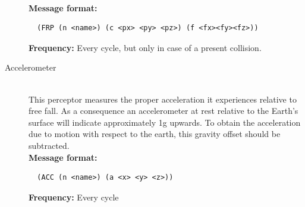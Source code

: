 \begin{description}
  \hfill \\
{ \bf Message format:}
  \begin{verbatim}
  (FRP (n <name>) (c <px> <py> <pz>) (f <fx><fy><fz>))
  \end{verbatim}
   { \bf Frequency:}
	Every cycle, but only in case of a present collision.\\
  \item [Accelerometer] \hfill \\
  This perceptor measures the proper acceleration it experiences relative to free fall. As a consequence an accelerometer at rest relative to the Earth's surface will indicate approximately 1g upwards. To obtain the acceleration due to motion with respect to the earth, this gravity offset should be subtracted.
    \hfill \\
{ \bf Message format:}
  \begin{verbatim}
  (ACC (n <name>) (a <x> <y> <z>))
  \end{verbatim}
   { \bf Frequency:}
	Every cycle\\
\end{description}

